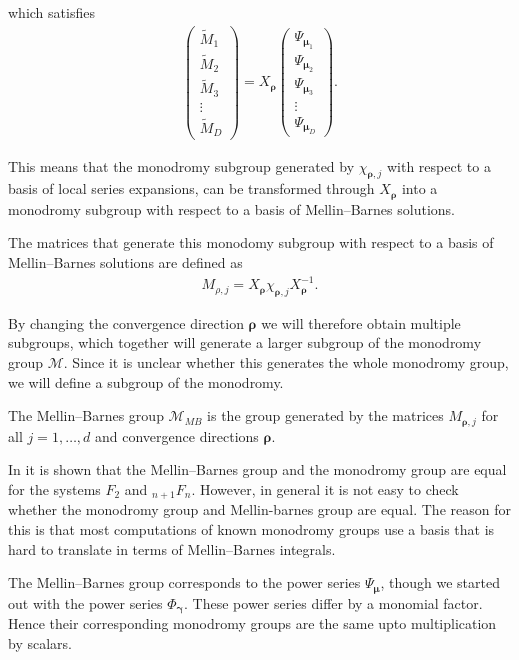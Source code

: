 \documentclass[pdftex]{sigma}
\numberwithin{equation}{section}
\begin{document}
which satisfies
\begin{gather*}
\begin{pmatrix}
\tilde{M}_1\\ \tilde{M}_2\\ \tilde{M}_3\\ \vdots \\ \tilde{M}_D\end{pmatrix} = X_{\bm\rho} \begin{pmatrix}\Psi_{\bm\mu_1} \\ \Psi_{\bm\mu_2} \\ \Psi_{\bm\mu_3} \\ \vdots \\ \Psi_{\bm\mu_D}
\end{pmatrix}\!.
\end{gather*}

This means that the monodromy subgroup generated by $\chi_{\bm\rho,j}$ with respect to a basis of local series expansions, can be transformed through $X_{\bm\rho}$ into a monodromy subgroup with respect to a basis of Mellin--Barnes solutions.

The matrices that generate this monodomy subgroup with respect to a basis of Mellin--Barnes solutions are defined as
\begin{gather*}
M_{\rho,j} = X_{\bm\rho}\chi_{\bm\rho,j}X_{\bm\rho}^{-1}.
\end{gather*}

By changing the convergence direction $\bm\rho$ we will therefore obtain multiple subgroups, which together will generate a larger subgroup of the monodromy group $\mathcal{M}$. Since it is unclear whether this generates the whole monodromy group, we will define a subgroup of the monodromy.

\begin{Definition}%
The Mellin--Barnes group $\mathcal{M}_{MB}$ is the group generated by the matrices $M_{\bm\rho,j}$ for all $j=1,\dots,d$ and convergence directions $\bm\rho$.
\end{Definition}

In \cite{Beu13} it is shown that the Mellin--Barnes group and the monodromy group are equal for the systems $F_2$ and ${}_{n+1}F_n$. However, in general it is not easy to check whether the monodromy group and Mellin-barnes group are equal. The reason for this is that most computations of known monodromy groups use a basis that is hard to translate in terms of Mellin--Barnes integrals.
\begin{Remark}
The Mellin--Barnes group corresponds to the power series $\Psi_{\bm\mu}$, though we started out with the power series $\Phi_{\bm\gamma}$. These power series differ by a monomial factor. Hence their corresponding monodromy groups are the same upto multiplication by scalars.
\end{Remark}
\end{document}
